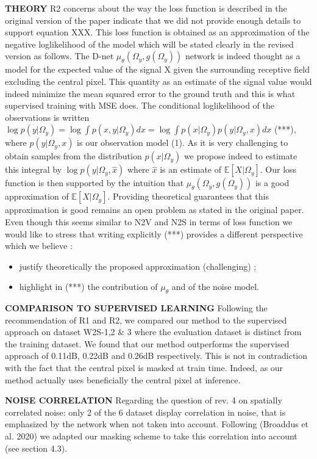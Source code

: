 \documentclass{article}
\begin{document}
\textbf{THEORY}
R2 concerns about the way the loss function is described in the original version of the paper indicate that we did not provide enough details to support equation XXX. This loss function is obtained as an approximation of the negative loglikelihood of the model which will be stated clearly in the revised version as follows.
The D-net $\mu_\theta(\Omega_y,g(\Omega_y))$ network is indeed thought as a model for the expected value of the signal X given the surrounding receptive field excluding the central pixel. This quantity as an estimate of the signal value would indeed minimize the mean squared error to the ground truth and this is what supervised training with MSE does.
The conditional loglikelihood of the observations is written $ \log p(y|\Omega_y) = \log \int p(x,y|\Omega_y)dx = \log \int p(x|\Omega_y)p(y|\Omega_y,x)dx$ (***), where $p(y|\Omega_y,x)$ is our observation model (1). As it is very challenging to obtain samples from the distribution $p(x|\Omega_y)$ we propose indeed to estimate this integral by $\log p(y|\Omega_y,\hat {x})$ where $\hat {x}$ is an estimate of $\mathbb{E}[X|\Omega_y]$. Our loss function is then supported by the intuition that $\mu_\theta(\Omega_y,g(\Omega_y))$ is a good approximation of $\mathbb{E}[X|\Omega_y]$. Providing theoretical guarantees  that this approximation is good remains an open problem as stated in the original paper. Even though this seems similar to N2V and N2S in terms of loss function we would like to stress that writing explicitly (***) provides a different perspective which we believe :
\begin{itemize}
  \item justify theoretically the proposed approximation (challenging) ;
  \item highlight in (***) the contribution of $\mu_\theta$ and of the noise model.
\end{itemize}

\textbf{COMPARISON TO SUPERVISED LEARNING}
Following the recommendation of R1 and R2, we compared our method to the supervised approach on dataset W2S-1,2 \& 3 where the evaluation dataset is distinct from the training dataset. We found that our method outperforms the supervised approach of 0.11dB, 0.22dB and 0.26dB respectively. This is not in contradiction with the fact that the central pixel is masked at train time. Indeed, as our method actually uses beneficially the central pixel at inference.

\textbf{NOISE CORRELATION}
Regarding the question of rev. 4 on spatially correlated noise: only 2 of the 6 dataset display correlation in noise, that is emphasized by the network when not taken into account. Following (Broaddus et al. 2020) we adapted our masking scheme to take this correlation into account (see section 4.3).
\end{document}
